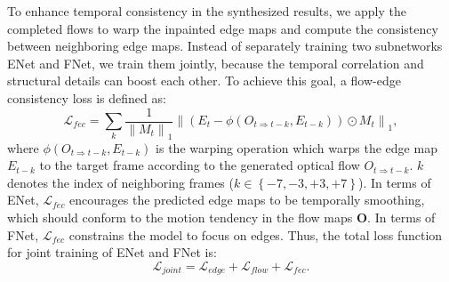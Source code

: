  
To enhance temporal consistency in the synthesized results, we apply the completed flows to warp the inpainted edge maps and compute the consistency between neighboring edge maps. 
%
Instead of separately training two subnetworks ENet and FNet, we train them jointly, because the temporal correlation and structural details can boost each other. 
To achieve this goal, a flow-edge consistency loss is defined as:
%
\begin{equation}
	\label{eq:flow_edge}
	\mathcal{L}_{fec}=\sum_{k}\frac{1}{\left\|M_{t} \right\|_1}\left\|(E_{t}-\phi(O_{t\Rightarrow t-k},E_{t-k}))\odot M_{t}\right\|_1,
\end{equation}
where $\phi(O_{t\Rightarrow t-k},E_{t-k})$ is the warping operation which warps the edge map $E_{t-k}$ to the target frame according to the generated optical flow $O_{t\Rightarrow t-k}$.
$k$ denotes the index of neighboring frames ($k\in \left\{-7,-3,+3,+7 \right\}$). 
In terms of ENet, $\mathcal{L}_{fec}$ encourages the predicted edge maps to be temporally smoothing, which should conform to the motion tendency in the flow maps $\boldsymbol{O}$. 
In terms of FNet, $\mathcal{L}_{fec}$ constrains the model to focus on edges.
Thus, the total loss function for joint training of ENet and FNet is:
\begin{equation}
	\label{eq:flow}
	\mathcal{L}_{joint}=\mathcal{L}_{edge}+\mathcal{L}_{flow}+ \mathcal{L}_{fec}.
\end{equation}



